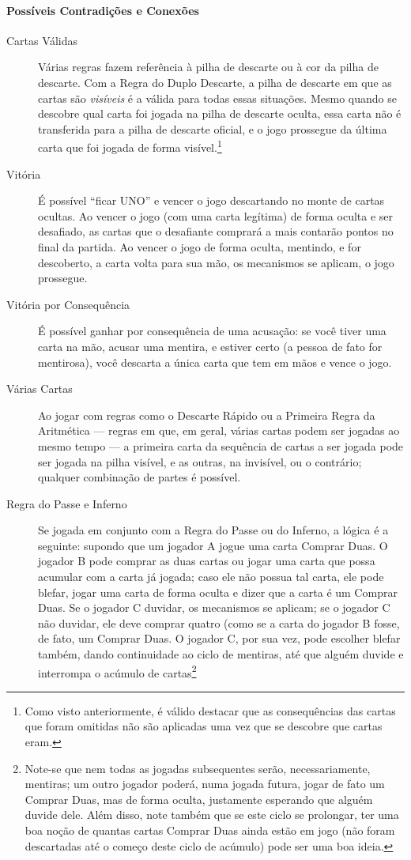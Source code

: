 \paragraph{Possíveis Contradições e Conexões}

\begin{description}
\item[Cartas Válidas]{Várias regras fazem referência à pilha de descarte ou à cor da pilha de descarte. Com a Regra do Duplo Descarte, a pilha de descarte em que as cartas são \emph{visíveis} é a válida para todas essas situações. Mesmo quando se descobre qual carta foi jogada na pilha de descarte oculta, essa carta não é transferida para a pilha de descarte oficial, e o jogo prossegue da última carta que foi jogada de forma visível.\footnote{Como visto anteriormente, é válido destacar que as consequências das cartas que foram omitidas não são aplicadas uma vez que se descobre que cartas eram.}}
\item[Vitória]{É possível ``ficar UNO'' e vencer o jogo descartando no monte de cartas ocultas. Ao vencer o jogo (com uma carta legítima) de forma oculta e ser desafiado, as cartas que o desafiante comprará a mais contarão pontos no final da partida. Ao vencer o jogo de forma oculta, mentindo, e for descoberto, a carta volta para sua mão, os mecanismos se aplicam, o jogo prossegue.}
\item[Vitória por Consequência]{É possível ganhar por consequência de uma acusação: se você tiver uma carta na mão, acusar uma mentira, e estiver certo (a pessoa de fato for mentirosa), você descarta a única carta que tem em mãos e vence o jogo.}
\item[Várias Cartas]{Ao jogar com regras como o Descarte Rápido ou a Primeira Regra da Aritmética --- regras em que, em geral, várias cartas podem ser jogadas ao mesmo tempo --- a primeira carta da sequência de cartas a ser jogada pode ser jogada na pilha visível, e as outras, na invisível, ou o contrário; qualquer combinação de partes é possível.}
\item[Regra do Passe e Inferno]{Se jogada em conjunto com a Regra do Passe ou do Inferno, a lógica é a seguinte: supondo que um jogador A jogue uma carta Comprar Duas. O jogador B pode comprar as duas cartas ou jogar uma carta que possa acumular com a carta já jogada; caso ele não possua tal carta, ele pode blefar, jogar uma carta de forma oculta e dizer que a carta é um Comprar Duas. Se o jogador C duvidar, os mecanismos se aplicam; se o jogador C não duvidar, ele deve comprar quatro (como se a carta do jogador B fosse, de fato, um Comprar Duas. O jogador C, por sua vez, pode escolher blefar também, dando continuidade ao ciclo de mentiras, até que alguém duvide e interrompa o acúmulo de cartas\footnote{Note-se que nem todas as jogadas subsequentes serão, necessariamente, mentiras; um outro jogador poderá, numa jogada futura, jogar de fato um Comprar Duas, mas de forma oculta, justamente esperando que alguém duvide dele. Além disso, note também que se este ciclo se prolongar, ter uma boa noção de quantas cartas Comprar Duas ainda estão em jogo (não foram descartadas até o começo deste ciclo de acúmulo) pode ser uma boa ideia.}}
\end{description}

